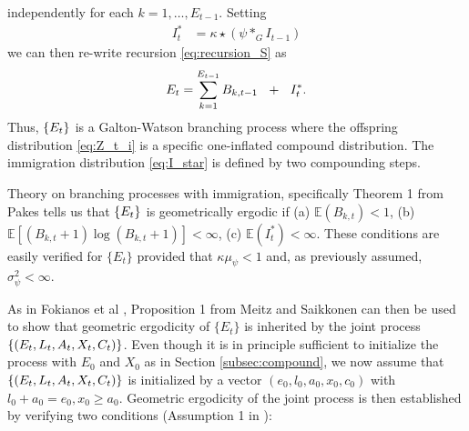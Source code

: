 \documentclass{article}
\begin{document}
independently for each $k = 1, \dots, E_{t - 1}$. Setting
\begin{align}
I^*_t & = \kappa\star (\psi *_G I_{t - 1}) \label{eq:I_star}
\end{align}
we can then re-write recursion \eqref{eq:recursion_S} as
$$
E_t = \sum_{k = 1}^{E_{t - 1}} B_{k, t - 1} \ \ + \ \ I^*_t.
$$
Thus, $\{E_t\}$ is a Galton-Watson branching process where the offspring distribution \eqref{eq:Z_t_i} is a specific one-inflated compound distribution. %
The immigration distribution \eqref{eq:I_star} is defined by two compounding steps. %

Theory on branching processes with immigration, specifically Theorem 1 from Pakes \cite{Pakes1971} tells us that $\{E_t\}$ is geometrically ergodic if (a) $\mathbb{E}(B_{k, t}) < 1$, (b) $\mathbb{E}[(B_{k, t} + 1)\log(B_{k, t} + 1)] < \infty$, (c) $\mathbb{E}(I^*_t) < \infty$. These conditions are easily verified for $\{E_t\}$ provided that $\kappa\mu_\psi < 1$ and, as previously assumed, $\sigma^2_\psi < \infty$.


As in Fokianos et al \cite{Fokianos2009}, Proposition 1 from Meitz and Saikkonen \cite{Meitz2008} can then be used to show that geometric ergodicity of $\{E_t\}$ is inherited by the joint process $\{(E_t, L_t, A_t, X_t, C_t)\}$. %
Even though it is in principle sufficient to initialize the process with $E_0$ and $X_0$ as in Section \ref{subsec:compound}, we now assume that $\{(E_t, L_t, A_t, X_t, C_t)\}$ is initialized by a vector $(e_0, l_0, a_0, x_0, c_0)$ with $l_0 + a_0 = e_0, x_0 \geq a_0$. Geometric ergodicity of the joint process is then established by verifying two conditions (Assumption 1 in \cite{Meitz2008}):
\end{document}
